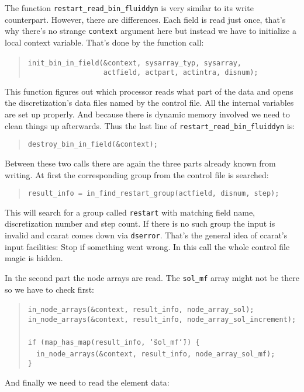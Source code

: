 The function \texttt{restart{\_}read{\_}bin{\_}fluiddyn} is
very similar to its write counterpart. However, there are differences.
Each field is read just once, that's why there's no strange \texttt{context}
argument here but instead we have to initialize a local context variable.
That's done by the function call: 

\begin{quote}
\texttt{init{\_}bin{\_}in{\_}field({\&}context,~sysarray{\_}typ,~sysarray,~}~\\
 \texttt{~~~~~~~~~~~~~~~~~~actfield,~actpart,~actintra,~disnum); }
\end{quote}
This function figures out which processor reads what part of the data
and opens the discretization's data files named by the control file.
All the internal variables are set up properly. And because there
is dynamic memory involved we need to clean things up afterwards.
Thus the last line of \texttt{restart{\_}read{\_}bin{\_}fluiddyn}
is: 

\begin{quote}
\texttt{destroy{\_}bin{\_}in{\_}field({\&}context); }
\end{quote}
Between these two calls there are again the three parts already known
from writing. At first the corresponding group from the control file
is searched: 

\begin{quote}
\texttt{result{\_}info~=~in{\_}find{\_}restart{\_}group(actfield,~disnum,~step); }
\end{quote}
This will search for a group called \texttt{restart} with matching
field name, discretization number and step count. If there is no such
group the input is invalid and ccarat comes down via \texttt{dserror}.
That's the general idea of ccarat's input facilities: Stop if something
went wrong. In this call the whole control file magic is hidden.

In the second part the node arrays are read. The \texttt{sol{\_}mf}
array might not be there so we have to check first: 

\begin{quote}
\texttt{in{\_}node{\_}arrays({\&}context,~result{\_}info,~node{\_}array{\_}sol);~}~\\
 \texttt{in{\_}node{\_}arrays({\&}context,~result{\_}info,~node{\_}array{\_}sol{\_}increment);~}~\\
 \texttt{if~(map{\_}has{\_}map(result{\_}info,~\char`\"{}sol{\_}mf\char`\"{}))~{\{}~}~\\
 \texttt{~~in{\_}node{\_}arrays({\&}context,~result{\_}info,~node{\_}array{\_}sol{\_}mf);~}~\\
 \texttt{{\}} }
\end{quote}
And finally we need to read the element data: 

